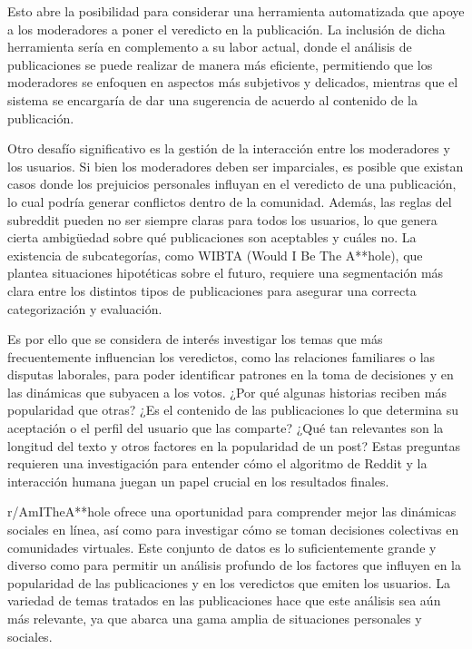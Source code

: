 Esto abre la posibilidad para considerar una herramienta automatizada que apoye a los moderadores a poner el veredicto en la publicación. La inclusión de dicha herramienta sería en complemento a su labor actual, donde el análisis de publicaciones se puede realizar de manera más eficiente, permitiendo que los moderadores se enfoquen en aspectos más subjetivos y delicados, mientras que el sistema se encargaría de dar una sugerencia de acuerdo al contenido de la publicación.

Otro desafío significativo es la gestión de la interacción entre los moderadores y los usuarios. Si bien los moderadores deben ser imparciales, es posible que existan casos donde los prejuicios personales influyan en el veredicto de una publicación, lo cual podría generar conflictos dentro de la comunidad. Además, las reglas del subreddit pueden no ser siempre claras para todos los usuarios, lo que genera cierta ambigüedad sobre qué publicaciones son aceptables y cuáles no. La existencia de subcategorías, como WIBTA (Would I Be The A**hole), que plantea situaciones hipotéticas sobre el futuro, requiere una segmentación más clara entre los distintos tipos de publicaciones para asegurar una correcta categorización y evaluación.

Es por ello que se considera de interés investigar los temas que más frecuentemente influencian los veredictos, como las relaciones familiares o las disputas laborales, para poder identificar patrones en la toma de decisiones y en las dinámicas que subyacen a los votos. ¿Por qué algunas historias reciben más popularidad que otras? ¿Es el contenido de las publicaciones lo que determina su aceptación o el perfil del usuario que las comparte? ¿Qué tan relevantes son la longitud del texto y otros factores en la popularidad de un post? Estas preguntas requieren una investigación para entender cómo el algoritmo de Reddit y la interacción humana juegan un papel crucial en los resultados finales.

r/AmITheA**hole ofrece una oportunidad para comprender mejor las dinámicas sociales en línea, así como para investigar cómo se toman decisiones colectivas en comunidades virtuales. Este conjunto de datos es lo suficientemente grande y diverso como para permitir un análisis profundo de los factores que influyen en la popularidad de las publicaciones y en los veredictos que emiten los usuarios. La variedad de temas tratados en las publicaciones hace que este análisis sea aún más relevante, ya que abarca una gama amplia de situaciones personales y sociales.

